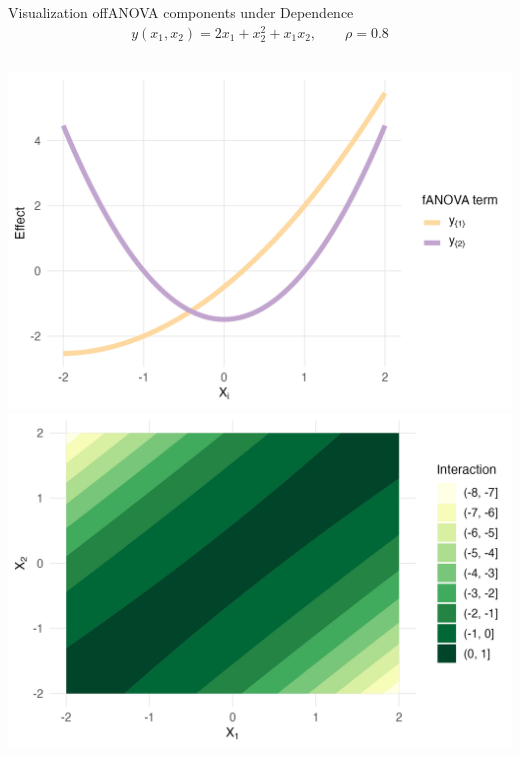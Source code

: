 \begin{frame}{Visualization offANOVA components under Dependence} %
    \begin{align*}
    y(x_1, x_2) = 2x_1 + x_2^{2} + x_1 x_2, \qquad \rho = 0.8
  \end{align*}
  \begin{columns}
      \includegraphics[width=\linewidth]{../images/experiment_section/gen_ex_1_a1p20_a2p00_a11p00_a22p10_a12p10_rhop08_main.png}
      \includegraphics[width=\linewidth]{../images/experiment_section/gen_ex_1_a1p20_a2p00_a11p00_a22p10_a12p10_rhop08_interaction.png}
  \end{columns}
\end{frame}

